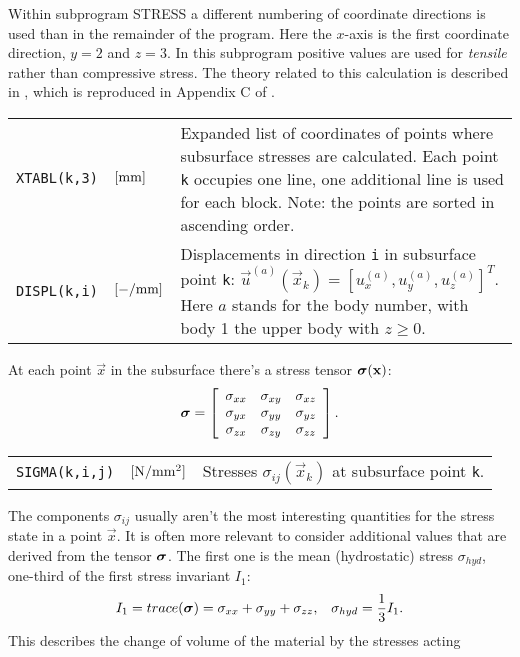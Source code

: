 \documentclass[12pt]{report}
\newenvironment{inputvars}{\vspace{0.4\baselineskip}%

\begin{tabular}{>{\raggedright}p{22mm}p{19mm}p{113mm}}}{
\end{tabular}

}
\newcommand{\inpvar}[3]{{\small\tt #1} & $#2$ & #3 \\[1ex]}
\newcommand{\inpvarw}[3]{\mbox{{\small\tt #1}\hspace{-5mm}} & $#2$ & #3 \\[1ex]}
\begin{document}
Within subprogram STRESS a different numbering of coordinate directions is
used than in the remainder of the program. Here the $x$-axis is the first
coordinate direction, $y=2$ and $z=3$. In this subprogram positive values
are used for {\em tensile\/} rather than compressive stress.
The theory related to this calculation is described in \cite{Kalker1986a},
which is reproduced in Appendix C of \cite{Kalker1990}.
\begin{inputvars}
\inpvar{\tt XTABL(k,3)}{\bunit{mm}}{Expanded list of coordinates of points where
        subsurface stresses are calculated. Each point {\tt k} occupies one
        line, one additional line is used for each block.
        Note: the points are sorted in ascending order.}
\inpvar{\tt DISPL(k,i)}{\bunit{-/mm}}{Displacements in direction {\tt i}
        in subsurface point {\tt k}: $\vec{u}^{(a)}(\vec{x}_k) =
        [u_x^{(a)},u_y^{(a)},u_z^{(a)}]^T$.
        Here $a$ stands for the body number, with body 1 the upper body
        with $z\ge 0$.}
\end{inputvars}
At each point $\vec{x}$ in the subsurface there's a stress tensor
$\boldsymbol{\sigma}(\mathbf{x})$:
\begin{equation}\label{eq:sigma}
     \boldsymbol{\sigma} = \left[ \begin{array}{ccc} 
                        \sigma_{xx} & \sigma_{xy} & \sigma_{xz}   \\
                        \sigma_{yx} & \sigma_{yy} & \sigma_{yz}   \\
                        \sigma_{zx} & \sigma_{zy} & \sigma_{zz}
                \end{array} \right] .
\end{equation}
\begin{inputvars}
\inpvarw{\tt SIGMA(k,i,j)}{\bunit{N/mm^2}}{Stresses \label{itm:sigma}
        $\sigma_{ij}(\vec{x}_k)$ at subsurface point {\tt k}.}
\end{inputvars}
The components $\sigma_{ij}$ usually aren't the most interesting quantities
for the stress state in a point $\vec{x}$. It is often more relevant to
consider additional values that are derived from the tensor $\boldsymbol{\sigma}$. The
first one is the mean (hydrostatic) stress $\sigma_{hyd}$, one-third of the
first stress invariant $I_1$:
\begin{equation}\label{eq:sighyd} 
    I_1 = trace(\boldsymbol{\sigma}) = \sigma_{xx} + \sigma_{yy} + \sigma_{zz}, \;\;\;
     \sigma_{hyd} = \frac{1}{3} I_1.
\end{equation}
This describes the change of volume of the material by the stresses acting
\end{document}
